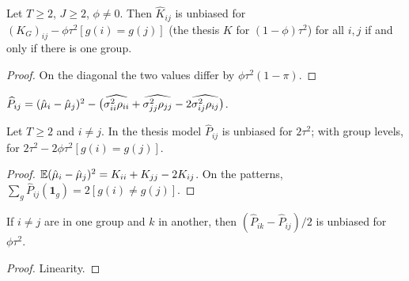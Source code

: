 \begin{corollary}\label{cor:KHat_G_iff}
  \leanok
  Let $T \ge 2$, $J \ge 2$, $\phi \ne 0$. Then $\hat K_{ij}$ is unbiased for
  $(K_G)_{ij} - \phi\tau^2[g(i) = g(j)]$ (the thesis $K$ for $(1-\phi)\tau^2$)
  for all $i, j$ if and only if there is one group.
\end{corollary}
\begin{proof}
  \leanok
  On the diagonal the two values differ by $\phi\tau^2(1 - \pi)$.
\end{proof}

\begin{definition}\label{def:pairHat}
  \leanok
  $\widehat{P}_{ij} = (\hat\mu_i - \hat\mu_j)^2 - \big(\widehat{\sigma^2_{ii}\rho_{ii}}
  + \widehat{\sigma^2_{jj}\rho_{jj}} - 2\widehat{\sigma^2_{ij}\rho_{ij}}\big)$.
\end{definition}

\begin{theorem}\label{thm:pairHat_G}
  \leanok
  Let $T \ge 2$ and $i \ne j$. In the thesis model $\widehat P_{ij}$ is unbiased
  for $2\tau^2$; with group levels, for $2\tau^2 - 2\phi\tau^2[g(i) = g(j)]$.
\end{theorem}
\begin{proof}
  \leanok
  $\mathbb E(\hat\mu_i - \hat\mu_j)^2 = K_{ii} + K_{jj} - 2K_{ij}$. On the patterns,
  $\sum_g \widehat P_{ij}(\mathbf 1_g) = 2[g(i) \ne g(j)]$.
\end{proof}

\begin{corollary}\label{cor:phiTauHat}
  \leanok
  If $i \ne j$ are in one group and $k$ in another, then
  $(\widehat P_{ik} - \widehat P_{ij})/2$ is unbiased for $\phi\tau^2$.
\end{corollary}
\begin{proof}
  \leanok
  Linearity.
\end{proof}


